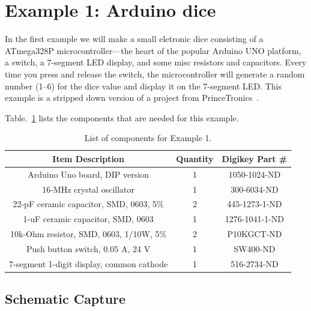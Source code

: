 \documentclass[12pt,letterpaper]{scrartcl}
\begin{document}
\section{Example 1: Arduino dice}
In the first example we will make a small eletronic dice consisting of a ATmega328P microcontroller---the heart of the popular Arduino UNO platform, a switch, a 7-segment LED display, and some misc resistors and capacitors. Every time you press and release the switch, the microcontroller will generate a random number (1--6) for the dice value and display it on the 7-segment LED. This example is a stripped down version of a project from PrinceTronics~\cite{dice}. 

Table.~\ref{tab:example1} lists the components that are needed for this example.

\begin{table}[h]
\centering
\caption{List of components for Example 1.}
\begin{tabular}{|c|c|c|}
\hline \bf  Item Description & \bf Quantity & \bf Digikey Part \# \\ 
\hline \hline  Arduino Uno board, DIP version & 1 & 1050-1024-ND \\ 
\hline  16-MHz crystal oscillator &  1 & 300-6034-ND \\ 
\hline  22-pF ceramic capacitor, SMD, 0603, 5\% & 2 & 445-1273-1-ND  \\ 
\hline  1-uF ceramic capacitor, SMD, 0603 & 1 & 1276-1041-1-ND \\ 
\hline  10k-Ohm resistor, SMD, 0603, 1/10W, 5\% & 2 & P10KGCT-ND \\ 
\hline  Push button switch, 0.05 A, 24 V  & 1 & SW400-ND \\ 
\hline  7-segment 1-digit display, 
common cathode & 1 & 516-2734-ND \\ 
\hline 
\end{tabular} 
\label{tab:example1}
\end{table}

\subsection{Schematic Capture}
\end{document}
